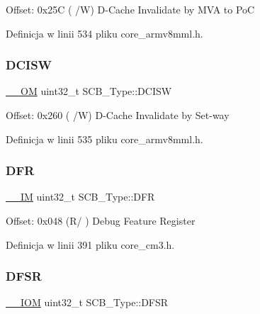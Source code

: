 Offset\+: 0x25C ( /W) D-\/\+Cache Invalidate by M\+VA to PoC 

Definicja w linii 534 pliku core\+\_\+armv8mml.\+h.

\mbox{\label{struct_s_c_b___type_a22bcfd7e1bffebdbe98cdbc8d77a2f42}} 
\subsubsection{\texorpdfstring{D\+C\+I\+SW}{DCISW}}
{\footnotesize\ttfamily \hyperlink{core__sc300_8h_a0ea2009ed8fd9ef35b48708280fdb758}{\+\_\+\+\_\+\+OM} uint32\+\_\+t S\+C\+B\+\_\+\+Type\+::\+D\+C\+I\+SW}

Offset\+: 0x260 ( /W) D-\/\+Cache Invalidate by Set-\/way 

Definicja w linii 535 pliku core\+\_\+armv8mml.\+h.

\mbox{\label{struct_s_c_b___type_a85dd6fe77aab17e7ea89a52c59da6004}} 
\subsubsection{\texorpdfstring{D\+FR}{DFR}}
{\footnotesize\ttfamily \hyperlink{core__sc300_8h_a4cc1649793116d7c2d8afce7a4ffce43}{\+\_\+\+\_\+\+IM} uint32\+\_\+t S\+C\+B\+\_\+\+Type\+::\+D\+FR}

Offset\+: 0x048 (R/ ) Debug Feature Register 

Definicja w linii 391 pliku core\+\_\+cm3.\+h.

\mbox{\label{struct_s_c_b___type_a191579bde0d21ff51d30a714fd887033}} 
\subsubsection{\texorpdfstring{D\+F\+SR}{DFSR}}
{\footnotesize\ttfamily \hyperlink{core__sc300_8h_ab6caba5853a60a17e8e04499b52bf691}{\+\_\+\+\_\+\+I\+OM} uint32\+\_\+t S\+C\+B\+\_\+\+Type\+::\+D\+F\+SR}

